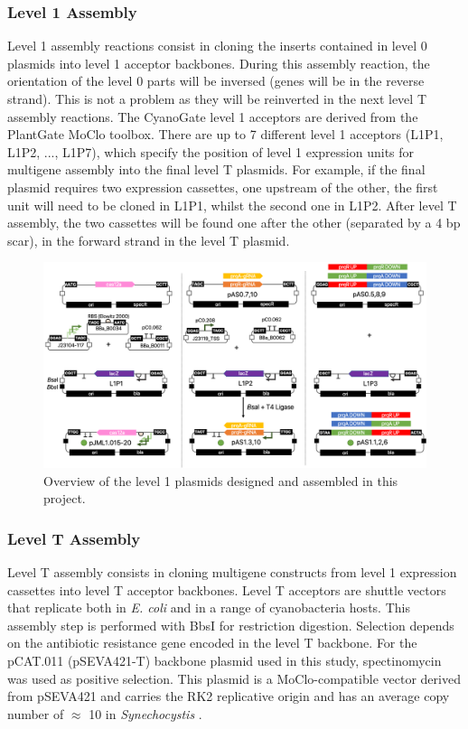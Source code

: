 \subsubsection{Level 1 Assembly}
Level 1 assembly reactions consist in cloning the inserts contained in level 0 plasmids into level 1 acceptor backbones. During this assembly reaction, the orientation of the level 0 parts will be inversed (genes will be in the reverse strand). This is not a problem as they will be reinverted in the next level T assembly reactions.
The CyanoGate level 1 acceptors are derived from the PlantGate MoClo toolbox. There are up to 7 different level 1 acceptors (L1P1, L1P2, ..., L1P7), which specify the position of level 1 expression units for multigene assembly into the final level T plasmids. For example, if the final plasmid requires two expression cassettes, one upstream of the other, the first unit will need to be cloned in L1P1, whilst the second one in L1P2. After level T assembly, the two cassettes will be found one after the other (separated by a 4 bp scar), in the forward strand in the level T plasmid. 


\begin{figure}[H]
    \centering
    \includegraphics[width=\hsize]{figs/l1.png}
    \caption{Overview of the level 1 plasmids designed and assembled in this project.}
\end{figure}

\subsubsection{Level T Assembly}
Level T assembly consists in cloning multigene constructs from level 1 expression cassettes into level T acceptor backbones. Level T acceptors are shuttle vectors that replicate both in \textit{E. coli} and in a range of cyanobacteria hosts. This assembly step is performed with BbsI for restriction digestion. Selection depends on the antibiotic resistance gene encoded in the level T backbone. For the pCAT.011 (pSEVA421-T) backbone plasmid used in this study, spectinomycin was used as positive selection.
This plasmid is a MoClo-compatible vector derived from pSEVA421 and carries the RK2 replicative origin and has an average copy number of $\approx$ 10 in \textit{Synechocystis} \citep{Vasudevan2019}.


